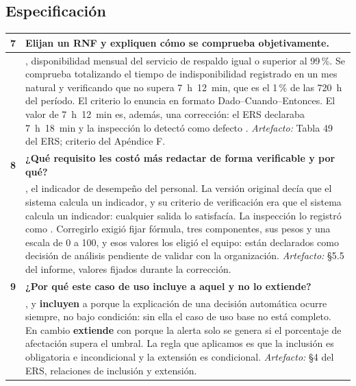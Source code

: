 \subsection*{Especificación}

\begin{longtable}{|C{0.7cm}|L{14.6cm}|}
\hline
{}\textbf{7} & \textbf{Elijan un RNF y expliquen cómo se comprueba objetivamente.}\\ \hline
& , disponibilidad mensual del servicio de respaldo igual o superior al 99\,\%. Se comprueba totalizando el tiempo de indisponibilidad registrado en un mes natural y verificando que no supera 7~h~12~min, que es el 1\,\% de las 720~h del período. El criterio  lo enuncia en formato Dado--Cuando--Entonces. El valor de 7~h~12~min es, además, una corrección: el ERS declaraba 7~h~18~min y la inspección lo detectó como defecto . \newline \emph{Artefacto:} Tabla 49 del ERS; criterio  del Apéndice F.\\ \hline
{}\textbf{8} & \textbf{¿Qué requisito les costó más redactar de forma verificable y por qué?}\\ \hline
& , el indicador de desempeño del personal. La versión original decía que el sistema calcula un indicador, y su criterio de verificación era que el sistema calcula un indicador: cualquier salida lo satisfacía. La inspección lo registró como . Corregirlo exigió fijar fórmula, tres componentes, sus pesos y una escala de 0 a 100, y esos valores los eligió el equipo: están declarados como decisión de análisis pendiente de validar con la organización. \newline \emph{Artefacto:} \S5.5 del informe, valores fijados durante la corrección.\\ \hline
{}\textbf{9} & \textbf{¿Por qué este caso de uso incluye a aquel y no lo extiende?}\\ \hline
& ,  y  \textbf{incluyen} a  porque la explicación de una decisión automática ocurre siempre, no bajo condición: sin ella el caso de uso base no está completo. En cambio  \textbf{extiende} con  porque la alerta solo se genera si el porcentaje de afectación supera el umbral. La regla que aplicamos es que la inclusión es obligatoria e incondicional y la extensión es condicional. \newline \emph{Artefacto:} \S4 del ERS, relaciones de inclusión y extensión.\\ \hline
\end{longtable}

